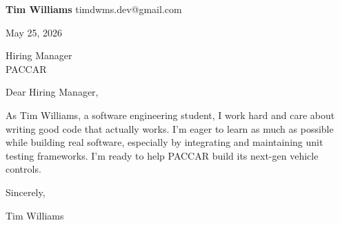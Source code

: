 \documentclass[12pt]{article}
\begin{document}
\textbf{Tim Williams} \hfill timdwms.dev@gmail.com

\vspace{1em}

May 25, 2026

\vspace{1em}

Hiring Manager \\
PACCAR

\vspace{1em}

Dear Hiring Manager,

As Tim Williams, a software engineering student, I work hard and care about writing good code that actually works. I'm eager to learn as much as possible while building real software, especially by integrating and maintaining unit testing frameworks. I’m ready to help PACCAR build its next-gen vehicle controls.

\vspace{1em}

Sincerely,

\vspace{2em}

Tim Williams
\end{document}
